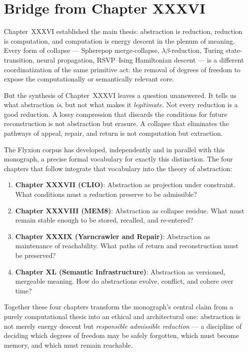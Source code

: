 \documentclass[12pt,letterpaper]{article}
\theoremstyle{remark}
\begin{document}
\section*{Bridge from Chapter XXXVI}

Chapter~XXXVI established the main thesis: abstraction is reduction,
reduction is computation, and computation is energy descent in the
plenum of meaning. Every form of collapse — Spherepop merge-collapse,
$\lambda\beta$-reduction, Turing state-transition, neural propagation,
RSVP--Ising Hamiltonian descent — is a different coordinatization of
the same primitive act: the removal of degrees of freedom to expose
the computationally or semantically relevant core.

But the synthesis of Chapter~XXXVI leaves a question unanswered. It
tells us what abstraction \emph{is}, but not what makes it
\emph{legitimate}. Not every reduction is a good reduction. A lossy
compression that discards the conditions for future reconstruction is
not abstraction but erasure. A collapse that eliminates the pathways
of appeal, repair, and return is not computation but extraction.

The Flyxion corpus has developed, independently and in parallel with
this monograph, a precise formal vocabulary for exactly this
distinction. The four chapters that follow integrate that vocabulary
into the theory of abstraction:

\begin{enumerate}
\item \textbf{Chapter XXXVII (CLIO)}: Abstraction as projection under
  constraint. What conditions must a reduction preserve to be
  admissible?
\item \textbf{Chapter XXXVIII (MEM\textbar{}8)}: Abstraction as
  collapse residue. What must remain stable enough to be stored,
  recalled, and re-entered?
\item \textbf{Chapter XXXIX (Yarncrawler and Repair)}: Abstraction as
  maintenance of reachability. What paths of return and reconstruction
  must be preserved?
\item \textbf{Chapter XL (Semantic Infrastructure)}: Abstraction as
  versioned, mergeable meaning. How do abstractions evolve, conflict,
  and cohere over time?
\end{enumerate}

Together these four chapters transform the monograph's central claim
from a purely computational thesis into an ethical and architectural
one: abstraction is not merely energy descent but \emph{responsible
admissible reduction} — a discipline of deciding which degrees of
freedom may be safely forgotten, which must become memory, and which
must remain reachable.
\end{document}
